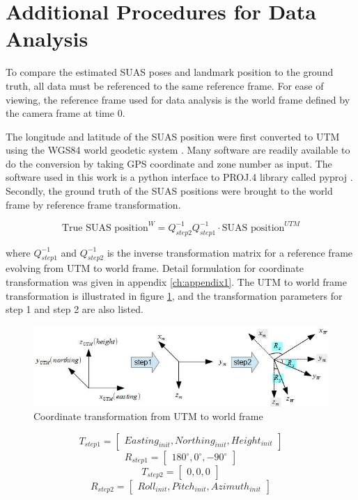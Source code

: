 \section{Additional Procedures for Data Analysis}
To compare the estimated SUAS poses and landmark position to the ground
truth, all data must be referenced to the same reference frame. For
ease of viewing, the reference frame used for data analysis is the
world frame defined by the camera frame at time 0. 

The longitude and latitude of the SUAS position were first converted
to UTM using the WGS84 world geodetic system \cite{_world_????}. Many
software are readily available to do the conversion by taking GPS
coordinate and zone number as input. The software used in this work is
a python interface to PROJ.4 library \cite{_pyproj_????} called pyproj
\cite{_pyproj_????}. Secondly, the ground truth of the SUAS positions
were brought to the world frame by reference frame transformation.

$$\text{True SUAS position}^W = 
Q_{step2}^{-1}Q_{step1}^{-1} \cdot\text{SUAS position}^{UTM}$$

\noindent where $Q_{step1}^{-1}$ and $Q_{step2}^{-1}$ is the inverse
transformation matrix for a reference frame evolving from UTM to world
frame. Detail formulation for coordinate transformation was given in
appendix \ref{ch:appendix1}. The UTM to world frame transformation is
illustrated in figure \ref{fig:utm_to_world}, and the transformation
parameters for step 1 and step 2 are also listed.

\begin{figure}[h]
  \centering
  \includegraphics[width=12cm,keepaspectratio=true]{./Figures/utm_to_world.jpg}
  \caption{Coordinate transformation from UTM to world frame}
  \label{fig:utm_to_world}
\end{figure}

$$T_{step1} = \begin{bmatrix}Easting_{init}, Northing_{init},
  Height_{init}\end{bmatrix}$$
$$R_{step1} = \begin{bmatrix}180^{\circ}, 0^{\circ},
  -90^{\circ}\end{bmatrix}$$
$$T_{step2} = \begin{bmatrix}0, 0, 0\end{bmatrix}$$
$$R_{step2} = \begin{bmatrix}Roll_{init}, Pitch_{init},
  Azimuth_{init}\end{bmatrix}$$

